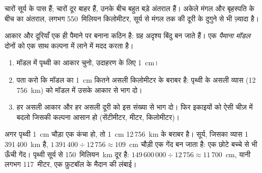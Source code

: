 चारों  सूर्य के पास हैं; चारों  दूर बाहर हैं, उनके बीच बहुत बड़े
अंतराल हैं। अकेले मंगल और बृहस्पति के बीच का अंतराल, लगभग 550~मिलियन किलोमीटर, सूर्य से मंगल तक की दूरी के दुगुने से भी ज़्यादा है।

आकार और दूरियाँ एक ही पैमाने पर बनाना कठिन है: ग्रह अदृश्य बिंदु बन जाते हैं। एक
\emph{पैमाना मॉडल} दोनों को एक साथ कल्पना में लाने में मदद करता है।

\begin{method}[सौर मंडल का पैमाना मॉडल बनाना]\label{met:g6:earth-a-planet:scale-model}
\begin{enumerate}
  \item मॉडल में पृथ्वी का आकार चुनो, उदाहरण के लिए 1~cm।
  \item पता करो कि मॉडल का 1~cm कितने असली किलोमीटर के बराबर है: पृथ्वी के असली
        व्यास (12\,756~km) को मॉडल में उसके आकार से भाग दो।
  \item हर असली आकार और हर असली दूरी को इस संख्या से भाग दो।
        फिर इकाइयों को ऐसी चीज़ में बदलो जिसकी कल्पना आसान हो (सेंटीमीटर,
        मीटर, किलोमीटर)।
\end{enumerate}
\end{method}

\begin{example}[पृथ्वी के लिए एक कंचा]\label{ex:g6:earth-a-planet:marble}
अगर पृथ्वी 1~cm चौड़ा एक कंचा हो, तो 1~cm 12\,756~km के बराबर है। सूर्य,
जिसका व्यास 1\,391\,400~km है, $1\,391\,400 \div 12\,756 \approx
109$~cm चौड़ी एक गेंद बन जाता है: एक छोटे बच्चे से भी ऊँची गेंद। पृथ्वी सूर्य से
150~मिलियन~km दूर है: $149\,600\,000 \div 12\,756 \approx 11\,700$~cm,
यानी लगभग 117~मीटर, एक फ़ुटबॉल के मैदान की लंबाई।
\end{example}

